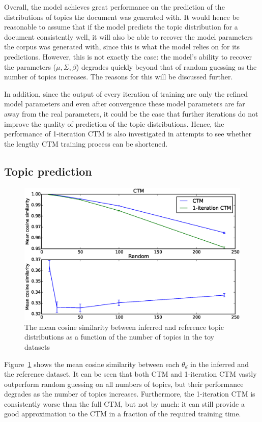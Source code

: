 \documentclass[12pt,a4paper,twoside,openright]{report}
\begin{document}
Overall, the model achieves great performance on the prediction of the distributions of topics the document was generated with. It would hence be reasonable to assume that if the model predicts the topic distribution for a document consistently well, it will also be able to recover the model parameters the corpus was generated with, since this is what the model relies on for its predictions. However, this is not exactly the case: the model's ability to recover the parameters ($\mu, \Sigma, \beta$) degrades quickly beyond that of random guessing as the number of topics increases. The reasons for this will be discussed further.

In addition, since the output of every iteration of training are only the refined model parameters and even after convergence these model parameters are far away from the real parameters, it could be the case that further iterations do not improve the quality of prediction of the topic distributions. Hence, the performance of 1-iteration CTM is also investigated in attempts to see whether the lengthy CTM training process can be shortened.

\subsection{Topic prediction}

\begin{figure}[!htb]
\includegraphics[width=\textwidth]{sim-cosine.eps}
\caption{The mean cosine similarity between inferred and reference topic distributions as a function of the number of topics in the toy datasets}
\label{fig:sim-cosine}
\end{figure}

Figure~\ref{fig:sim-cosine} shows the mean cosine similarity between each $\theta_d$ in the inferred and the reference dataset. It can be seen that both CTM and 1-iteration CTM vastly outperform random guessing on all numbers of topics, but their performance degrades as the number of topics increases. Furthermore, the 1-iteration CTM is consistently worse than the full CTM, but not by much: it can still provide a good approximation to the CTM in a fraction of the required training time.
\end{document}
